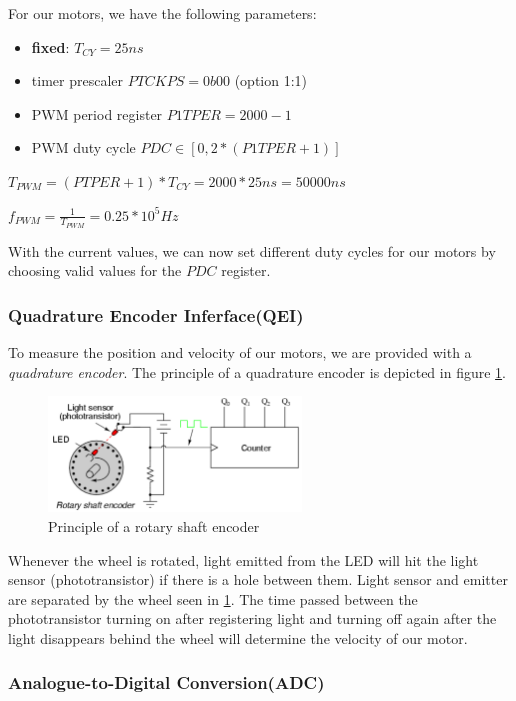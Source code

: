 For our motors, we have the following parameters:
\begin{itemize}
    \item \textbf{fixed}: $T_{CY} = 25 ns$
    \item timer prescaler $PTCKPS = 0b00$ (option 1:1)
    \item PWM period register $P1TPER = 2000 - 1$
    \item PWM duty cycle $PDC \in [0, 2*(P1TPER + 1)]$
\end{itemize}
$T_{PWM} = ( PTPER + 1 ) * T_{CY} = 2000 * 25ns = 50000 ns$


$f_{PWM} = \frac{1}{T_{PWM}} = 0.25 * 10^{5} Hz$

With the current values, we can now set different duty cycles for our motors by choosing valid values for the $PDC$ register.


\subsubsection*{Quadrature Encoder Inferface(QEI)}
To measure the position and velocity of our motors, we are provided with a \textit{quadrature encoder}. The principle of a quadrature encoder is depicted in figure \ref{fig:qei_demo}. 

\begin{figure}[htb]
    \centering
    \includegraphics[width=0.6\textwidth]{figures/software/qei_demo.png}
    \caption {Principle of a rotary shaft encoder \cite{alex}}
    \label{fig:qei_demo}
\end{figure}

Whenever the wheel is rotated, light emitted from the LED will hit the light sensor (phototransistor) if there is a hole between them. Light sensor and emitter are separated by the wheel seen in \ref{fig:qei_demo}.
The time passed between the phototransistor turning on after registering light and turning off again after the light disappears behind the wheel will determine the velocity of our motor.


\subsubsection*{Analogue-to-Digital Conversion(ADC)}

